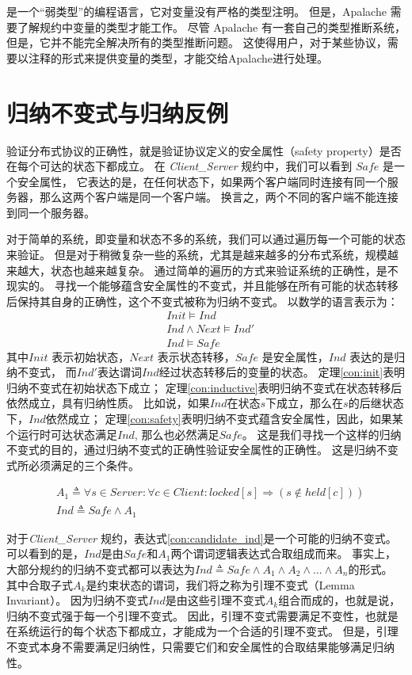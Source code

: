 \TLA 是一个“弱类型”的编程语言，它对变量没有严格的类型注明。
但是，Apalache 需要了解\TLA 规约中变量的类型才能工作。
尽管 Apalache 有一套自己的类型推断系统，但是，它并不能完全解决所有的类型推断问题。
这使得用户，对于某些协议，需要以注释的形式来提供变量的类型，才能交给Apalache进行处理。

\section{归纳不变式与归纳反例}
验证分布式协议的正确性，就是验证协议定义的安全属性（safety property）是否在每个可达的状态下都成立。
在 \textit{Client\_Server} 规约中，我们可以看到 $Safe$ 是一个安全属性，
它表达的是，在任何状态下，如果两个客户端同时连接有同一个服务器，那么这两个客户端是同一个客户端。
换言之，两个不同的客户端不能连接到同一个服务器。

对于简单的系统，即变量和状态不多的系统，我们可以通过遍历每一个可能的状态来验证。
但是对于稍微复杂一些的系统，尤其是越来越多的分布式系统，规模越来越大，状态也越来越复杂。
通过简单的遍历的方式来验证系统的正确性，是不现实的。
寻找一个能够蕴含安全属性的不变式，并且能够在所有可能的状态转移后保持其自身的正确性，这个不变式被称为归纳不变式。
以数学的语言表示为：
\begin{align}
    &Init \vDash Ind \label{con:init}\\
    &Ind \land Next \vDash Ind' \label{con:inductive}\\
    &Ind \vDash Safe \label{con:safety}
\end{align}
其中$Init$ 表示初始状态，$Next$ 表示状态转移，$Safe$ 是安全属性，$Ind$ 表达的是归纳不变式，
而$Ind'$表达谓词$Ind$经过状态转移后的变量的状态。
定理\ref{con:init}表明归纳不变式在初始状态下成立；
定理\ref{con:inductive}表明归纳不变式在状态转移后依然成立，具有归纳性质。
比如说，如果$Ind$在状态$s$下成立，那么在$s$的后继状态下，$Ind$依然成立；
定理\ref{con:safety}表明归纳不变式蕴含安全属性，因此，如果某个运行时可达状态满足$Ind$, 那么也必然满足$Safe$。
这是我们寻找一个这样的归纳不变式的目的，通过归纳不变式的正确性验证安全属性的正确性。
这是归纳不变式所必须满足的三个条件。

\begin{align}
    &\left.A_{1} \triangleq \forall s \in  { Server }: \forall c \in  { Client }:  { locked }[s] \Rightarrow(s \notin { held }[c])\right) \\
    &{ Ind } \triangleq  { Safe } \wedge A_{1} \label{con:candidate_ind}
\end{align}

对于\textit{Client\_Server} 规约，表达式\ref{con:candidate_ind}是一个可能的归纳不变式。
可以看到的是，$Ind$是由$Safe$和$A_{1}$两个谓词逻辑表达式合取组成而来。
事实上，大部分规约的归纳不变式都可以表达为$Ind \triangleq Safe \wedge A_1 \wedge A_2 \wedge... \wedge A_n$的形式。
其中合取子式$A_k$是约束状态的谓词，我们将之称为引理不变式（Lemma Invariant）。
因为归纳不变式$Ind$是由这些引理不变式$A_k$组合而成的，也就是说，归纳不变式强于每一个引理不变式。
因此，引理不变式需要满足不变性，也就是在系统运行的每个状态下都成立，才能成为一个合适的引理不变式。
但是，引理不变式本身不需要满足归纳性，只需要它们和安全属性的合取结果能够满足归纳性。

